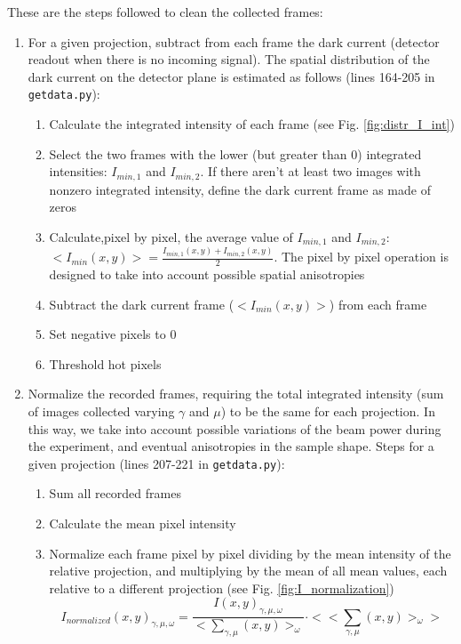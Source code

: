 \documentclass[11pt]{scrartcl}
\begin{document}
These are the steps followed to clean the collected frames:
\begin{enumerate}
    \item For a given projection, subtract from each frame the dark current (detector readout when there is no incoming signal). The spatial distribution of the dark current on the detector plane is estimated as follows (lines 164-205 in {\texttt{getdata.py}}):
    \begin{enumerate}
        \item Calculate the integrated intensity of each frame (see Fig. \ref{fig:distr_I_int})
        
        \item Select the two frames with the lower (but greater than 0) integrated intensities: $I_{min,1}$ and $I_{min,2}$. If there aren't at least two images with nonzero integrated intensity, define the dark current frame as made of zeros
        
        \item Calculate,pixel by pixel, the average value of $I_{min,1}$ and $I_{min,2}$: $<I_{min}(x,y)> = \frac{I_{min,1}(x,y) + I_{min,2}(x,y)}{2}$. The pixel by pixel operation is designed to take into account possible spatial anisotropies
        
        \item Subtract the dark current frame ($<I_{min}(x,y)>$) from each frame
        
        \item Set negative pixels to 0
        
        \item Threshold hot pixels
    \end{enumerate}
    
    \item Normalize the recorded frames, requiring the total integrated intensity (sum of images collected varying $\gamma$ and $\mu$) to be the same for each projection. In this way, we take into account possible
    variations of the beam power during the experiment, and eventual anisotropies in the sample shape. Steps for a given projection (lines 207-221 in {\texttt{getdata.py}}):
    \begin{enumerate}
        \item Sum all recorded frames
        
        \item Calculate the mean pixel intensity
        
        \item Normalize each frame pixel by pixel dividing by the mean intensity of the relative projection, and multiplying by the mean of all mean values, each relative to a different projection (see Fig. \ref{fig:I_normalization})
            \begin{equation}
                I_{normalized}(x,y)_{\gamma, \mu, \omega} = \frac{I(x,y)_{\gamma, \mu, \omega}}{<\sum_{\gamma, \mu} (x,y)>_{\omega}}\cdot <<\sum_{\gamma, \mu} (x,y)>_{\omega}>
            \end{equation}
    \end{enumerate}
    

\end{enumerate}
\end{document}
